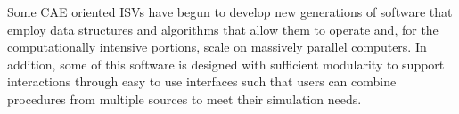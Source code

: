 Some CAE oriented ISVs have begun to develop new generations of software that
employ data structures and algorithms that allow them to operate and, for
the computationally intensive portions, scale on massively parallel computers.
In addition, some of this software is designed with sufficient modularity to
support interactions through easy to use interfaces such that users can combine
procedures from multiple sources to meet their simulation needs.
